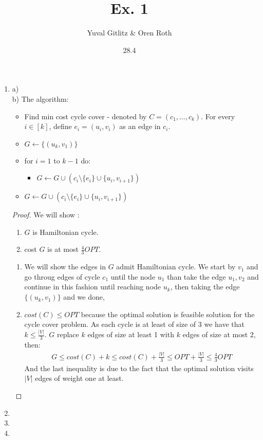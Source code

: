 \documentclass{article}
\title{Ex. 1}
\author{Yuval Gitlitz \& Oren Roth}
\date{28.4}
\begin{document}
\maketitle

\begin{enumerate}
	\item
a)
\\ 
b) The algorithm:
\begin{itemize}
	\item Find min cost cycle cover - denoted by $C = (c_1,\ldots,c_k)$. For every $i \in [k]$, define $e_i = (u_i,v_i)$ as an edge in $c_i$.
	\item $G\leftarrow \{(u_k,v_1)\}$
	\item for $i=1$ to $k-1$ do:
	\begin{itemize}
		\item $G \leftarrow G \cup (c_i \setminus \{e_i\} \cup \{u_i,v_{i+1}\})$
	\end{itemize}
	\item $G \leftarrow G \cup (c_i \setminus \{e_i\} \cup \{u_i,v_{i+1}\})$
\end{itemize}
\begin{proof}
We will show :
\begin{enumerate}[I]
	\item $G$ is Hamiltonian cycle. 
	\item cost $G$ is at most $\frac{4}{3}OPT$. 
\end{enumerate}
\begin{enumerate}[I]
	\item We will show the edges in $G$ admit Hamiltonian cycle. We start by $v_1$ and go throug edges of cycle $c_1$ until the node $u_1$ than take the edge $u_1,v_2$ and continue in this fashion until reaching node $u_k$, then taking the edge $\{(u_k,v_1)\}$ and we done,
	\item $cost(C) \le OPT$ because the optimal solution is feasible solution for the cycle cover problem. 
	As each cycle is at least of size of 3 we have that $k\le \frac{|V|}{3}$. $G$ replace $k$ edges of size at least 1 with $k$ edges of size at most $2$, then:
	\begin{align*}
	G \le cost(C) + k \le cost(C) + \frac{|V|}{3} \le OPT +\frac{|V|}{3} \le \frac{4}{3}OPT
	\end{align*}
	And the last inequality is due to the fact that the optimal solution visits $|V|$ edges of weight one at least. 
	
\end{enumerate}	
\end{proof}

\item
\item 
\item 
\end{enumerate}
\end{document}
